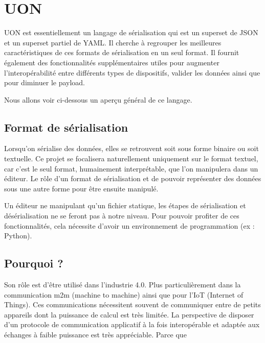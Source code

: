 \documentclass[
    iict, %
    il, %
]{heig-tb}
\begin{document}
\section{UON}
UON est essentiellement un langage de sérialisation qui est un superset de JSON et un superset partiel de YAML.
Il cherche à regrouper les meilleures caractéristiques de ces formats de sérialisation en un seul format.
Il fournit également des fonctionnalités supplémentaires utiles pour augmenter l'interopérabilité entre différents types de dispositifs, valider les données ainsi que pour diminuer le payload.

Nous allons voir ci-dessous un aperçu général de ce langage.

\subsection{Format de sérialisation}

Lorsqu'on sérialise des données, elles se retrouvent soit sous forme binaire ou soit textuelle.
Ce projet se focalisera naturellement uniquement sur le format textuel, car c'est le seul format, humainement interprétable, que l'on manipulera dans un éditeur.
Le rôle d'un format de sérialisation et de pouvoir représenter des données sous une autre forme pour être ensuite manipulé.

Un éditeur ne manipulant qu'un fichier statique, les étapes de sérialisation et désérialisation ne se feront pas à notre niveau.
Pour pouvoir profiter de ces fonctionnalités, cela nécessite d'avoir un environnement de programmation (ex : Python).



\subsection{Pourquoi ?}
Son rôle est d'être utilisé dans l'industrie 4.0. Plus particulièrement dans la communication m2m (machine to machine) ainsi que pour l'IoT (Internet of Things).
Ces communications nécessitent souvent de communiquer entre de petits appareils dont la puissance de calcul est très limitée.
La perspective de disposer d'un protocole de communication applicatif à la fois interopérable et adaptée aux échanges à faible puissance est très appréciable.
Parce que %
\end{document}
